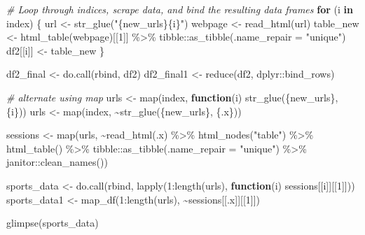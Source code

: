 \documentclass[
]{book}
\newenvironment{Shaded}{\begin{snugshade}}{\end{snugshade}}
\newcommand{\AttributeTok}[1]{\textcolor[rgb]{0.77,0.63,0.00}{#1}}
\newcommand{\CommentTok}[1]{\textcolor[rgb]{0.56,0.35,0.01}{\textit{#1}}}
\newcommand{\ControlFlowTok}[1]{\textcolor[rgb]{0.13,0.29,0.53}{\textbf{#1}}}
\newcommand{\DecValTok}[1]{\textcolor[rgb]{0.00,0.00,0.81}{#1}}
\newcommand{\FunctionTok}[1]{\textcolor[rgb]{0.00,0.00,0.00}{#1}}
\newcommand{\NormalTok}[1]{#1}
\newcommand{\OtherTok}[1]{\textcolor[rgb]{0.56,0.35,0.01}{#1}}
\newcommand{\SpecialCharTok}[1]{\textcolor[rgb]{0.00,0.00,0.00}{#1}}
\newcommand{\StringTok}[1]{\textcolor[rgb]{0.31,0.60,0.02}{#1}}
\begin{document}
\begin{Shaded}
\begin{Highlighting}[]
\CommentTok{\# Loop through indices, scrape data, and bind the resulting data frames}
\ControlFlowTok{for}\NormalTok{ (i }\ControlFlowTok{in}\NormalTok{ index) \{}
\NormalTok{  url }\OtherTok{\textless{}{-}} \FunctionTok{str\_glue}\NormalTok{(}\StringTok{"\{new\_urls\}\{i\}"}\NormalTok{)}
\NormalTok{  webpage }\OtherTok{\textless{}{-}} \FunctionTok{read\_html}\NormalTok{(url)}
\NormalTok{  table\_new }\OtherTok{\textless{}{-}} \FunctionTok{html\_table}\NormalTok{(webpage)[[}\DecValTok{1}\NormalTok{]] }\SpecialCharTok{\%\textgreater{}\%}
\NormalTok{    tibble}\SpecialCharTok{::}\FunctionTok{as\_tibble}\NormalTok{(}\AttributeTok{.name\_repair =} \StringTok{"unique"}\NormalTok{)}
\NormalTok{  df2[[i]] }\OtherTok{\textless{}{-}}\NormalTok{ table\_new}
\NormalTok{\}}

\NormalTok{df2\_final }\OtherTok{\textless{}{-}} \FunctionTok{do.call}\NormalTok{(rbind, df2)}
\NormalTok{df2\_final1 }\OtherTok{\textless{}{-}} \FunctionTok{reduce}\NormalTok{(df2, dplyr}\SpecialCharTok{::}\NormalTok{bind\_rows)}
\end{Highlighting}
\end{Shaded}

\begin{Shaded}
\begin{Highlighting}[]
\CommentTok{\# alternate using map}
\NormalTok{urls }\OtherTok{\textless{}{-}} \FunctionTok{map}\NormalTok{(index, }\ControlFlowTok{function}\NormalTok{(i) }\FunctionTok{str\_glue}\NormalTok{(\{new\_urls\}, \{i\}))}
\NormalTok{urls }\OtherTok{\textless{}{-}} \FunctionTok{map}\NormalTok{(index, }\SpecialCharTok{\textasciitilde{}}\FunctionTok{str\_glue}\NormalTok{(\{new\_urls\}, \{.x\}))}


\NormalTok{sessions }\OtherTok{\textless{}{-}} \FunctionTok{map}\NormalTok{(urls, }\SpecialCharTok{\textasciitilde{}}\FunctionTok{read\_html}\NormalTok{(.x) }\SpecialCharTok{\%\textgreater{}\%} 
                  \FunctionTok{html\_nodes}\NormalTok{(}\StringTok{"table"}\NormalTok{) }\SpecialCharTok{\%\textgreater{}\%} 
                  \FunctionTok{html\_table}\NormalTok{() }\SpecialCharTok{\%\textgreater{}\%} 
\NormalTok{                  tibble}\SpecialCharTok{::}\FunctionTok{as\_tibble}\NormalTok{(}\AttributeTok{.name\_repair =} \StringTok{"unique"}\NormalTok{) }\SpecialCharTok{\%\textgreater{}\%} 
\NormalTok{                  janitor}\SpecialCharTok{::}\FunctionTok{clean\_names}\NormalTok{())}

\NormalTok{sports\_data }\OtherTok{\textless{}{-}} \FunctionTok{do.call}\NormalTok{(rbind, }\FunctionTok{lapply}\NormalTok{(}\DecValTok{1}\SpecialCharTok{:}\FunctionTok{length}\NormalTok{(urls), }\ControlFlowTok{function}\NormalTok{(i) sessions[[i]][[}\DecValTok{1}\NormalTok{]]))}
\NormalTok{sports\_data1 }\OtherTok{\textless{}{-}} \FunctionTok{map\_df}\NormalTok{(}\DecValTok{1}\SpecialCharTok{:}\FunctionTok{length}\NormalTok{(urls), }\SpecialCharTok{\textasciitilde{}}\NormalTok{sessions[[.x]][[}\DecValTok{1}\NormalTok{]])}

\FunctionTok{glimpse}\NormalTok{(sports\_data)}
\end{Highlighting}
\end{Shaded}
\end{document}
